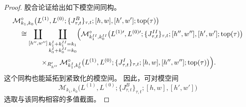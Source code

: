 \begin{proof}
胶合论证给出如下模空间同构。
\[
\begin{aligned}
&\mathcal M^\circ_{k_1,k_0}
\bigl(
L^{(1)},L^{(0)};
\{J^B_{\tau,t}\}_{\tau,t};
[h,w],[h',w'];
\operatorname{top}(\tau)
\bigr)\\
&\quad\cong
\coprod_{[h'',w'']}
\coprod_{\substack{
k_1^I+k_1^{II}=k_1\\
k_0^I+k_0^{II}=k_0}}
\Bigl(
\mathcal M^\circ_{k_1^{II},k_0^{II}}
\bigl(
L^{(1)\prime},L^{(0)\prime};
\{J^{II}_{\tau,t}\}_{\tau,t};
[h'',w''],[h',w'];
\operatorname{top}(\tau)
\bigr)\\
&\qquad\qquad
\times_{R'_{h''}}
\mathcal M^\circ_{k_1^I,k_0^I}
\bigl(
L^{(1)},L^{(0)};
\{J^I_{\tau,t}\}_{\tau,t};
[h,w],[h'',w''];
\operatorname{top}(\tau)
\bigr)
\Bigr).
\end{aligned}
\]
这个同构也能延拓到紧致化的模空间。
因此，可对模空间
\[
\mathcal M_{k_1,k_0}
\bigl(
L^{(1)},L^{(0)};
\{J^B_{\tau,t}\}_{\tau,t};
[h,w],[h',w']
\bigr)
\]
选取与该同构相容的多值截面。


\end{proof}
